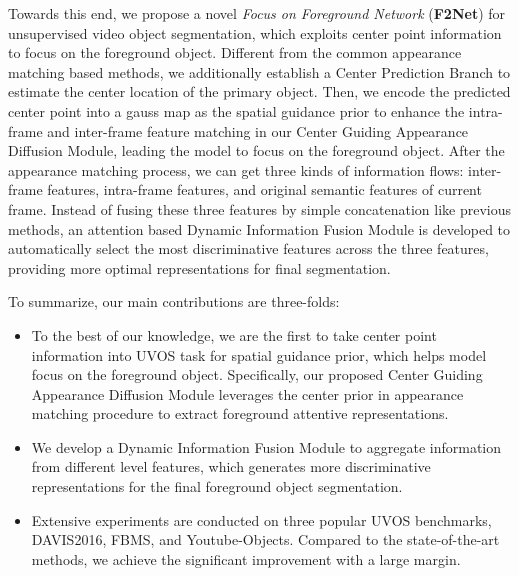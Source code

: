 \documentclass[letterpaper]{article} \usepackage{aaai20}  \usepackage{times}  \usepackage{helvet} \usepackage{courier}  \usepackage[hyphens]{url}  \usepackage{graphicx} \urlstyle{rm} \def\UrlFont{\rm}  \usepackage{graphicx}  \frenchspacing  \setlength{\pdfpagewidth}{8.5in}  \setlength{\pdfpageheight}{11in}  \usepackage{amssymb}
\begin{document}
Towards this end, we propose a novel \textit{Focus on Foreground Network}  (\textbf{F2Net}) for unsupervised video object segmentation, which exploits center point information to focus on the foreground object. 
Different from the common appearance matching based methods, we additionally establish a Center Prediction Branch to estimate the center location of the primary object.
Then, we encode the predicted center point into a gauss map as the spatial guidance prior to enhance the intra-frame and inter-frame feature matching in our Center Guiding Appearance Diffusion Module, leading the model to focus on the foreground object. 
After the appearance matching process, we can get three kinds of information flows: inter-frame features, intra-frame features, and original semantic features of current frame.
Instead of fusing these three features by simple concatenation like previous methods, an attention based Dynamic Information Fusion Module is developed to automatically select the most discriminative features across the three features, providing more optimal representations for final segmentation.


To summarize, our main contributions are three-folds:
\begin{itemize}
    \item To the best of our knowledge, we are the first to take center point information into UVOS task for spatial guidance prior, which helps model focus on the foreground object. Specifically, our proposed Center Guiding Appearance Diffusion Module leverages the center prior in appearance matching procedure to extract foreground attentive representations.
\item We develop a Dynamic Information Fusion Module to aggregate information from different level features, which generates more discriminative representations for the final foreground object segmentation.
    \item Extensive experiments are conducted on three popular UVOS benchmarks, DAVIS2016, FBMS, and Youtube-Objects. Compared to the state-of-the-art methods, we achieve the significant improvement with a large margin.
\end{itemize}
\end{document}

